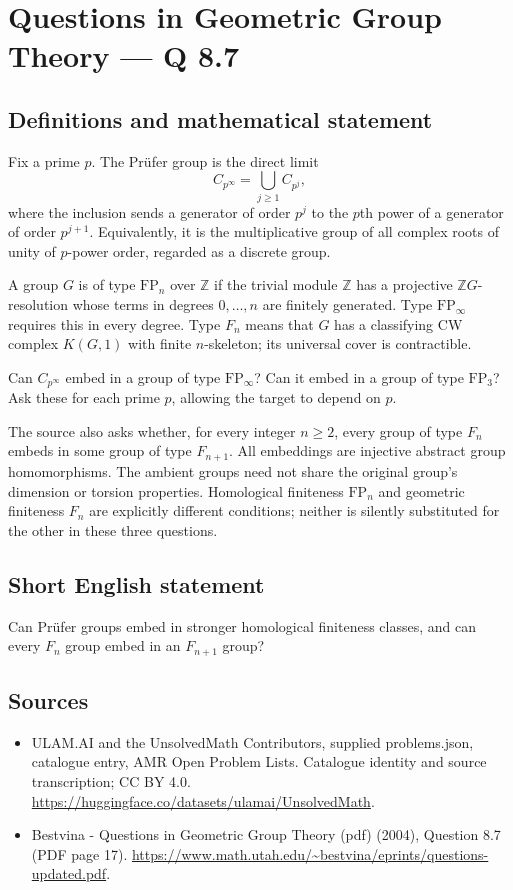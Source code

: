 \documentclass[11pt,a4paper]{article}
\begin{document}
\section*{Questions in Geometric Group Theory — Q 8.7}\label{statement}

\subsection{Definitions and mathematical statement}
Fix a prime $p$. The Prüfer group is the direct limit
\[
 C_{p^\infty}=\bigcup_{j\geq1}C_{p^j},
\]
where the inclusion sends a generator of order $p^j$ to the $p$th power of a generator of order $p^{j+1}$. Equivalently, it is the multiplicative group of all complex roots of unity of $p$-power order, regarded as a discrete group.

A group $G$ is of type $\mathrm{FP}_n$ over $\mathbb Z$ if the trivial module $\mathbb Z$ has a projective $\mathbb ZG$-resolution whose terms in degrees $0,\ldots,n$ are finitely generated. Type $\mathrm{FP}_\infty$ requires this in every degree. Type $F_n$ means that $G$ has a classifying CW complex $K(G,1)$ with finite $n$-skeleton; its universal cover is contractible.

Can $C_{p^\infty}$ embed in a group of type $\mathrm{FP}_\infty$? Can it embed in a group of type $\mathrm{FP}_3$? Ask these for each prime $p$, allowing the target to depend on $p$.

The source also asks whether, for every integer $n\geq2$, every group of type $F_n$ embeds in some group of type $F_{n+1}$. All embeddings are injective abstract group homomorphisms. The ambient groups need not share the original group's dimension or torsion properties. Homological finiteness $\mathrm{FP}_n$ and geometric finiteness $F_n$ are explicitly different conditions; neither is silently substituted for the other in these three questions.
\subsection{Short English statement}
Can Prüfer groups embed in stronger homological finiteness classes, and can every $F_n$ group embed in an $F_{n+1}$ group?
\subsection{Sources}
\begin{itemize}
\item[S1] ULAM.AI and the UnsolvedMath Contributors, supplied problems.json, catalogue entry, AMR Open Problem Lists. Catalogue identity and source transcription; CC BY 4.0.
\url{https://huggingface.co/datasets/ulamai/UnsolvedMath}.
\item[S2] Bestvina - Questions in Geometric Group Theory (pdf) (2004), Question 8.7 (PDF page 17). 
\url{https://www.math.utah.edu/~bestvina/eprints/questions-updated.pdf}.
\end{itemize}
\end{document}
